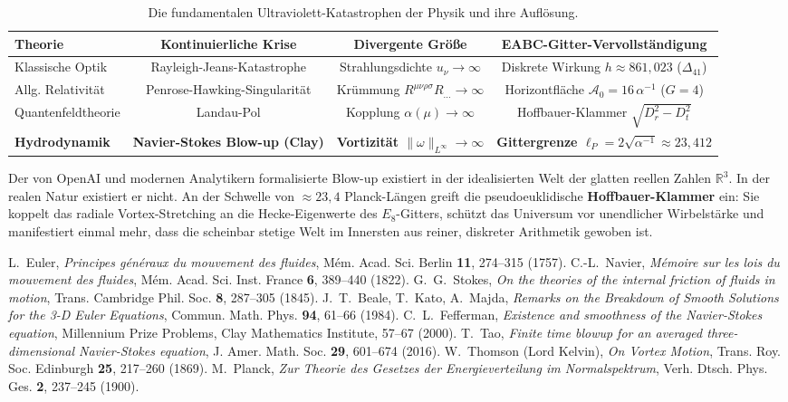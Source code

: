 \documentclass[11pt,a4paper]{article}
\begin{document}
\begin{table}[h!]
\centering
\small
\begin{tabular}{lccc}
\toprule
\textbf{Theorie} & \textbf{Kontinuierliche Krise} & \textbf{Divergente Größe} & \textbf{EABC-Gitter-Vervollständigung} \\
\midrule
Klassische Optik & Rayleigh-Jeans-Katastrophe & Strahlungsdichte $u_\nu \to \infty$ & Diskrete Wirkung $h \approx 861{,}023$ ($\Delta_{41}$) \\
Allg. Relativität & Penrose-Hawking-Singularität & Krümmung $R^{\mu\nu\rho\sigma}R_{\dots} \to \infty$ & Horizontfläche $\mathcal{A}_0 = 16\,\alpha^{-1}$ ($G=4$) \\
Quantenfeldtheorie & Landau-Pol & Kopplung $\alpha(\mu) \to \infty$ & Hoffbauer-Klammer $\sqrt{D_r^2 - D_t^2}$ \\
\textbf{Hydrodynamik} & \textbf{Navier-Stokes Blow-up (Clay)} & \textbf{Vortizität $\|\omega\|_{L^\infty} \to \infty$} & \textbf{Gittergrenze $\ell_P = 2\sqrt{\alpha^{-1}} \approx 23{,}412$} \\
\bottomrule
\end{tabular}
\caption{Die fundamentalen Ultraviolett-Katastrophen der Physik und ihre Auflösung.}
\label{tab:uv_catastrophes}
\end{table}

Der von OpenAI und modernen Analytikern formalisierte Blow-up existiert in der idealisierten Welt der glatten reellen Zahlen $\mathbb{R}^3$. In der realen Natur existiert er nicht. An der Schwelle von $\approx 23{,}4$ Planck-Längen greift die pseudoeuklidische \textbf{Hoffbauer-Klammer} ein: Sie koppelt das radiale Vortex-Stretching an die Hecke-Eigenwerte des $E_8$-Gitters, schützt das Universum vor unendlicher Wirbelstärke und manifestiert einmal mehr, dass die scheinbar stetige Welt im Innersten aus reiner, diskreter Arithmetik gewoben ist.

\begin{thebibliography}{99}
 L.~Euler, \emph{Principes généraux du mouvement des fluides}, Mém. Acad. Sci. Berlin \textbf{11}, 274--315 (1757).
 C.-L.~Navier, \emph{Mémoire sur les lois du mouvement des fluides}, Mém. Acad. Sci. Inst. France \textbf{6}, 389--440 (1822).
 G.~G.~Stokes, \emph{On the theories of the internal friction of fluids in motion}, Trans. Cambridge Phil. Soc. \textbf{8}, 287--305 (1845).
 J.~T.~Beale, T.~Kato, A.~Majda, \emph{Remarks on the Breakdown of Smooth Solutions for the 3-D Euler Equations}, Commun. Math. Phys. \textbf{94}, 61--66 (1984).
 C.~L.~Fefferman, \emph{Existence and smoothness of the Navier-Stokes equation}, Millennium Prize Problems, Clay Mathematics Institute, 57--67 (2000).
 T.~Tao, \emph{Finite time blowup for an averaged three-dimensional Navier-Stokes equation}, J. Amer. Math. Soc. \textbf{29}, 601--674 (2016).
 W.~Thomson (Lord Kelvin), \emph{On Vortex Motion}, Trans. Roy. Soc. Edinburgh \textbf{25}, 217--260 (1869).
 M.~Planck, \emph{Zur Theorie des Gesetzes der Energieverteilung im Normalspektrum}, Verh. Dtsch. Phys. Ges. \textbf{2}, 237--245 (1900).
\end{thebibliography}
\end{document}
